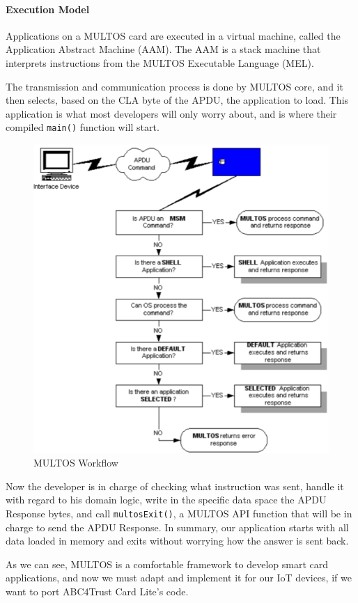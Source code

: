 \paragraph{Execution Model}
Applications on a MULTOS card are executed in a virtual machine, called the Application Abstract Machine (AAM). The AAM is a stack machine that interprets instructions from the MULTOS Executable
Language (MEL).

The transmission and communication process is done by MULTOS core, and it then selects, based on the CLA byte of the APDU, the application to load. This application is what most developers will only worry about, and is where their compiled \texttt{main()} function will start.

\begin{figure}[bth]
	\begin{center}
		\includegraphics[width=0.6\linewidth]{gfx/multosWorkflow}
	\end{center}
	\caption{MULTOS Workflow}
	\label{fig:multosWorkflow}
\end{figure}

Now the developer is in charge of checking what instruction was sent, handle it with regard to his domain logic,  write in the specific data space the APDU Response bytes, and call \texttt{multosExit()}, a MULTOS API function that will be in charge to send the APDU Response.
In summary, our application starts with all data loaded in memory and exits without worrying how the answer is sent back.

As we can see, MULTOS is a comfortable framework to develop smart card applications, and now we must adapt and implement it for our IoT devices, if we want to port ABC4Trust Card Lite's code.



